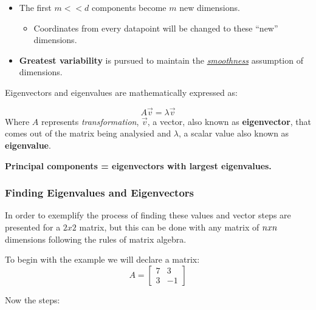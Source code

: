 \documentclass[]{book}
\providecommand{\tightlist}{%
  \setlength{\itemsep}{0pt}\setlength{\parskip}{0pt}}
\begin{document}
\begin{itemize}
\tightlist
\item
  The first \(m<<d\) components become \(m\) new dimensions.

  \begin{itemize}
  \tightlist
  \item
    Coordinates from every datapoint will be changed to these ``new''
    dimensions.
  \end{itemize}
\item
  \textbf{Greatest variability} is pursued to maintain the
  \href{https://rpubs.com/generaviles/248692}{\emph{smoothness}}
  assumption of dimensions.
\end{itemize}

 Eigenvectors and eigenvalues are mathematically expressed as:

\[A \overrightarrow{v} = \lambda \overrightarrow{v}\] Where \(A\)
represents \emph{transformation}, \(\overrightarrow{v}\), a vector, also
known as \textbf{eigenvector}, that comes out of the matrix being
analysied and \(\lambda\), a scalar value also known as
\textbf{eigenvalue}.

\textbf{Principal components = eigenvectors with largest eigenvalues.}

\subsubsection{Finding Eigenvalues and
Eigenvectors}\label{finding-eigenvalues-and-eigenvectors}

In order to exemplify the process of finding these values and vector
steps are presented for a \(2x2\) matrix, but this can be done with any
matrix of \(n\space x\space n\) dimensions following the rules of matrix
algebra.

To begin with the example we will declare a matrix:
\[A =  \left[ \begin{array}{ccc}
7 & 3 \\
3 & -1  \end{array} \right]\]

Now the steps:
\end{document}
